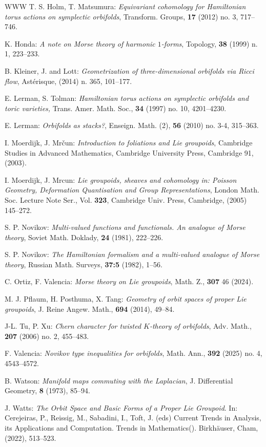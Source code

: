 \documentclass[
  a4paper, 
  reqno, 
  oneside, 
  12pt
]{amsart}
\theoremstyle{definition}
\theoremstyle{remark}
\begin{document}
\begin{thebibliography}{WWW}
 T. S. Holm, T. Matsumura: \emph{Equivariant cohomology for {H}amiltonian torus actions on symplectic orbifolds}, Transform. Groups, {\bf 17} (2012) no. 3, 717--746.


 K. Honda: \emph{A note on {M}orse theory of harmonic {$1$}-forms}, Topology, {\bf 38} (1999) n. 1, 223--233.


 B. Kleiner, J. and Lott: \emph{Geometrization of three-dimensional orbifolds {\it via} {R}icci flow}, Ast\'{e}risque,  (2014) n. 365, 101--177.

 E. Lerman, S. Tolman: \emph{Hamiltonian torus actions on symplectic orbifolds and toric varieties,} Trans. Amer. Math. Soc., {\bf 34} (1997) no. 10, 4201--4230.

 E. Lerman: \emph{Orbifolds as stacks?}, Enseign. Math. (2), {\bf 56} (2010) no. 3-4, 315--363.

 I. Moerdijk, J. Mr\v{c}un: \emph{Introduction to foliations and {L}ie groupoids}, Cambridge Studies in Advanced Mathematics, Cambridge University Press, Cambridge 91, (2003). 

 I. Moerdijk, J. Mrcun: \emph{Lie groupoids, sheaves and cohomology in: Poisson Geometry, Deformation Quantisation and Group Representations}, London Math. Soc. Lecture Note Ser., Vol. {\bf 323}, Cambridge Univ. Press, Cambridge, (2005) 145--272.

 S. P. Novikov: \emph{Multi-valued functions and functionals. An analogue of Morse theory}, Soviet Math. Doklady, {\bf 24} (1981), 222--226.

 S. P. Novikov: \emph{The Hamiltonian formalism and a multi-valued analogue of Morse theory}, Russian Math. Surveys, {\bf 37:5} (1982), 1--56.

 C. Ortiz, F. Valencia: \emph{Morse theory on {L}ie groupoids}, Math. Z., {\bf 307} 46 (2024).

 M. J. Pflaum, H. Posthuma, X. Tang: \emph{Geometry of orbit spaces of proper {L}ie groupoids}, J. Reine Angew. Math., {\bf 694} (2014), 49--84.

 J-L. Tu, P. Xu: \emph{Chern character for twisted {$K$}-theory of orbifolds}, Adv. Math., {\bf 207} (2006) no. 2, 455--483.

 F. Valencia: \emph{Novikov type inequalities for orbifolds}, Math. Ann., {\bf 392} (2025) no. 4, 4543--4572.



 B. Watson: \emph{Manifold maps commuting with the {L}aplacian}, J. Differential Geometry, {\bf 8} (1973), 85--94.

 J. Watts: \emph{The Orbit Space and Basic Forms of a Proper Lie Groupoid}. In: Cerejeiras, P., Reissig, M., Sabadini, I., Toft, J. (eds) Current Trends in Analysis, its Applications and Computation. Trends in Mathematics(). Birkhäuser, Cham, (2022), 513--523. 




\end{thebibliography}
\end{document}

